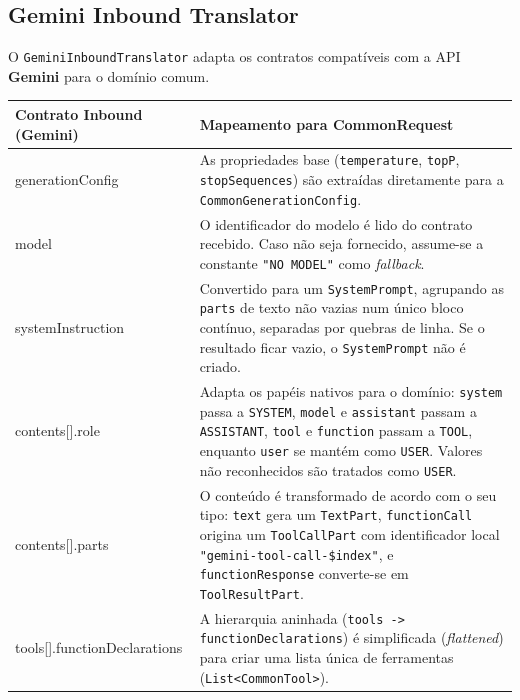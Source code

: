     \subsection{\textbf{Gemini} Inbound Translator}

O \texttt{GeminiInboundTranslator} adapta os contratos compatíveis com a API \textbf{Gemini} para o domínio comum.

\begin{table}[H]
    \centering
    \footnotesize
    \renewcommand{\arraystretch}{1.25}
    \begin{tabularx}{\textwidth}{|>{\ttfamily\raggedright\arraybackslash}p{4.5cm}|Y|}
        \hline
        \textbf{Contrato Inbound (Gemini)} & \textbf{Mapeamento para CommonRequest} \\
        \hline
        generationConfig & As propriedades base (\texttt{temperature}, \texttt{topP}, \texttt{stopSequences}) são extraídas diretamente para a \texttt{CommonGenerationConfig}. \\
        \hline
        model & O identificador do modelo é lido do contrato recebido. Caso não seja fornecido, assume-se a constante \texttt{"NO MODEL"} como \textit{fallback}. \\
        \hline
        systemInstruction & Convertido para um \texttt{SystemPrompt}, agrupando as \texttt{parts} de texto não vazias num único bloco contínuo, separadas por quebras de linha. Se o resultado ficar vazio, o \texttt{SystemPrompt} não é criado. \\
        \hline
        contents[].role & Adapta os papéis nativos para o domínio: \texttt{system} passa a \texttt{SYSTEM}, \texttt{model} e \texttt{assistant} passam a \texttt{ASSISTANT}, \texttt{tool} e \texttt{function} passam a \texttt{TOOL}, enquanto \texttt{user} se mantém como \texttt{USER}. Valores não reconhecidos são tratados como \texttt{USER}. \\
        \hline
        contents[].parts & O conteúdo é transformado de acordo com o seu tipo: \texttt{text} gera um \texttt{TextPart}, \texttt{functionCall} origina um \texttt{ToolCallPart} com identificador local \texttt{"gemini-tool-call-\$index"}, e \texttt{functionResponse} converte-se em \texttt{ToolResultPart}. \\
        \hline
        tools[].functionDeclarations & A hierarquia aninhada (\texttt{tools -> functionDeclarations}) é simplificada (\textit{flattened}) para criar uma lista única de ferramentas (\texttt{List<CommonTool>}). \\
        \hline

\end{tabularx}
\end{table}
